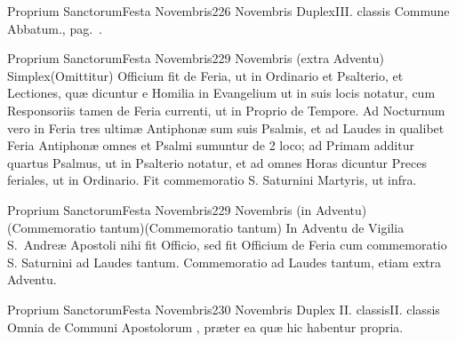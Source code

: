 \documentclass[nocturnale-romanum.tex]{subfiles}
\begin{document}
	{Proprium Sanctorum}{Festa Novembris}{2}{26 Novembris}
	{Duplex}{III. classis}
	{Commune Abbatum., pag.\ \pageref{M-COAB}.}
	{}

	{Proprium Sanctorum}{Festa Novembris}{2}{29 Novembris (extra Adventu)}
	{Simplex}{(Omittitur)}
	{Officium fit de Feria, ut in Ordinario et Psalterio, et Lectiones, quæ dicuntur e Homilia in Evangelium  ut in suis locis notatur, cum Responsoriis tamen de Feria currenti, ut in Proprio de Tempore. Ad Nocturnum vero in Feria  tres ultimæ Antiphonæ sum suis Psalmis, et ad Laudes in qualibet Feria Antiphonæ omnes et Psalmi sumuntur de 2 loco; ad Primam additur quartus Psalmus, ut in Psalterio notatur, et ad omnes Horas dicuntur Preces feriales, ut in Ordinario.}
	{Fit commemoratio S. Saturnini Martyris, ut infra.}

	{Proprium Sanctorum}{Festa Novembris}{2}{29 Novembris (in Adventu)}
	{(Commemoratio tantum)}{(Commemoratio tantum)}
	{In Adventu de Vigilia S.\ Andreæ Apostoli nihi fit Officio, sed fit Officium de Feria cum commemoratio S. Saturnini ad Laudes tantum.}
	{Commemoratio ad Laudes tantum, etiam extra Adventu.}

	{Proprium Sanctorum}{Festa Novembris}{2}{30 Novembris}
	{Duplex II. classis}{II. classis}
	{Omnia de Communi Apostolorum \pageref{M-APEX}, præter ea quæ hic habentur propria.}
	{}
\tedeumrubric
\end{document}
